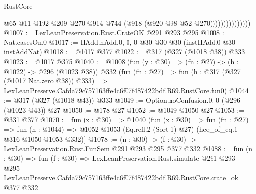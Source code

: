 \begin{lexlean}{RustCore}
\begin{coremodule}
                              @65
                              @11
                              @192
                              @209
                              @270
                              @914
                              @744
                              (@918 (@920 @98 @52 @270)))))))))))))))
@1007 := LexLeanPreservation.Rust.CrateOK @291 @293 @295
@1008 := Nat.casesOn.{0}
@1017 := HAdd.hAdd.{0, 0, 0} @30 @30 @30 (instHAdd.{0} @30 instAddNat)
@1018 := @1017 @377
@1022 := @317 (@327 (@1018 @38)) @333
@1023 := @1017 @375
@1040 := @1008
    (fun (y : @30) => (fn : @27) -> (h : @1022) -> @296 (@1023 @38))
    @332
    (fun (fn : @27) =>
    fun (h : @317 (@327 (@1017 Nat.zero @38)) @333) =>
    LexLeanPreserve.Cafda79c757163ffe4c6f07f487422bdf.R69.RustCore.fun0)
@1044 := @317 (@327 (@1018 @43)) @333
@1049 := Option.noConfusion.{0, 0} (@296 (@1023 @43)) @27
@1050 := @178 @27
@1052 := @1049 @1050 @27
@1053 := @331 @377
@1070 := fun (x : @30) =>
  @1040
    (fun (x : @30) =>
    fun (fn : @27) =>
    fun (h : @1044) => @1052 @1053 (Eq.refl.{2} (Sort 1) @27) (heq_of_eq.{1} @316 @1050 @1053 @332))
@1078 := (n : @30) -> (f : @30) -> LexLeanPreservation.Rust.FunSem @291 @293 @295 @377 @332
@1088 := fun (n : @30) =>
  fun (f : @30) =>
  LexLeanPreservation.Rust.simulate
    @291
    @293
    @295
    LexLeanPreserve.Cafda79c757163ffe4c6f07f487422bdf.R69.RustCore.crate_ok
    @377
    @332
\end{coremodule}
\end{lexlean}
